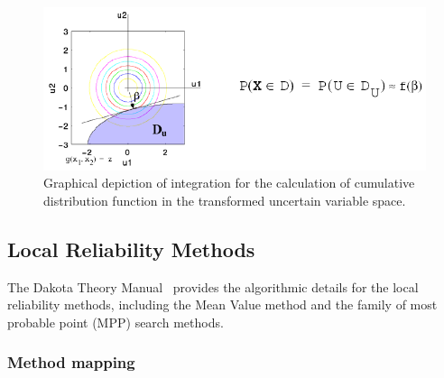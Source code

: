 \begin{figure}[htbp!]
  \centering
  \includegraphics[scale=0.75]{images/cdf_tran_graphic}
  \caption{Graphical depiction of integration for the calculation of
    cumulative distribution function in the transformed uncertain
    variable space.}
  \label{uq:figure06}
\end{figure}

\subsection{Local Reliability Methods}\label{uq:reliability:local}

The Dakota Theory Manual~\cite{TheoMan} provides the algorithmic
details for the local reliability methods, including the Mean Value
method and the family of most probable point (MPP) search methods.


\subsubsection{Method mapping} \label{uq:reliability:local:map}

